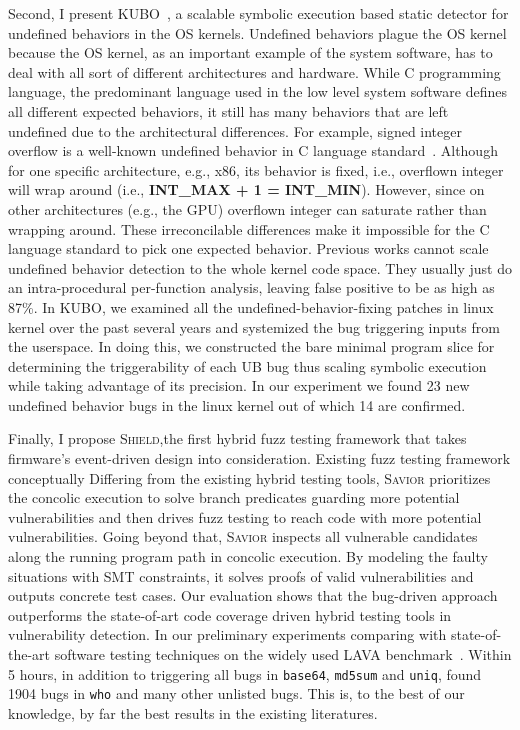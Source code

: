 Second, I present \textsc{KUBO}~\cite{kubo}, a scalable symbolic execution based static detector for undefined behaviors in the OS kernels.
Undefined behaviors plague the OS kernel because the OS kernel, as an important example of the system software, has to deal with all sort of different architectures and hardware. 
While C programming language, the predominant language used in the low level system software defines all different expected behaviors, it still has many behaviors that are left undefined due to the architectural differences. 
For example, signed integer overflow is a well-known undefined behavior in C language standard~\cite{misc:C-standard}. 
Although for one specific architecture, e.g., x86, its behavior is fixed, i.e., overflown integer will wrap around (i.e., \textbf{INT\_MAX + 1 = INT\_MIN}). 
However, since on other architectures (e.g., the GPU) overflown integer can saturate rather than wrapping around. 
These irreconcilable differences make it impossible for the C language standard to pick one expected behavior. 
Previous works cannot scale undefined behavior detection to the whole kernel code space. 
They usually just do an intra-procedural per-function analysis, leaving false positive to be as high as 87\%. 
In \textsc{KUBO}, we examined all the undefined-behavior-fixing patches in linux kernel over the past several years and systemized the bug triggering inputs from the userspace. 
In doing this, we constructed the bare minimal program slice for determining the triggerability of each UB bug thus scaling symbolic execution while taking advantage of its precision.
In our experiment we found 23 new undefined behavior bugs in the linux kernel out of which 14 are confirmed.

Finally, I propose \textsc{Shield},the first hybrid fuzz testing framework that takes firmware's event-driven design into consideration. 
Existing fuzz testing framework conceptually 
Differing from the existing hybrid testing tools, \textsc {Savior} prioritizes the concolic execution to solve branch predicates guarding more potential vulnerabilities and then drives fuzz testing to reach code with more potential vulnerabilities. 
Going beyond that, \textsc {Savior} inspects all vulnerable candidates along the running program path in concolic execution. 
By modeling the faulty situations with SMT constraints, it solves proofs of valid vulnerabilities and outputs concrete test cases. 
Our evaluation shows that the bug-driven approach outperforms the state-of-art code coverage driven hybrid testing tools in vulnerability detection. 
In our preliminary experiments comparing \savior with state-of-the-art software testing techniques on the widely used LAVA benchmark~\cite{lava}. 
Within 5 hours, in addition to triggering all bugs in {\tt base64}, {\tt md5sum} and {\tt uniq}, \savior found 1904 bugs in {\tt who} and many other unlisted bugs. This is, to the best of our knowledge, by far the best results in the existing literatures.


